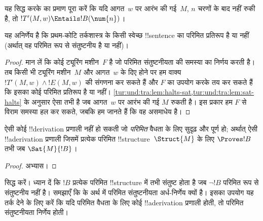 \documentclass[../../../include/open-logic-section]{subfiles}
\begin{document}
\begin{prob}
  यह सिद्ध करके  का प्रमाण पूरा
  करें कि यदि आगत~$w$ पर आरंभ की गई~$M$, $n$ चरणों के बाद नहीं रुकी है,
  तो $!T'(M,w) \Entails !B(\num{n})$।
\end{prob}

\begin{thm}[ट्राख्टेनब्रॉट का प्रमेय]
  यह अनिर्णेय है कि प्रथम-कोटि तर्कशास्त्र के किसी स्वेच्छ
  !!{sentence} का परिमित प्रतिरूप है या नहीं (अर्थात् वह परिमित रूप से
  संतुष्टनीय है या नहीं)।
\end{thm}

\begin{proof}
  मान लें कि कोई ट्यूरिंग मशीन~$F$ है जो परिमित संतुष्टनीयता की समस्या
  का निर्णय करती है। तब किसी भी ट्यूरिंग मशीन~$M$ और आगत~$w$ के दिए
  होने पर हम वाक्य~$!T'(M,w) \land !E(M,w)$ की संगणना कर सकते
  हैं और $F$ का उपयोग करके तय कर सकते हैं कि इसका कोई परिमित प्रतिरूप
  है या नहीं।
  \cref{tur:und:tra:lem:halts-sat,tur:und:tra:lem:sat-halts} के अनुसार
  ऐसा तभी है जब आगत~$w$ पर आरंभ की गई $M$ रुकती है। इस प्रकार हम $F$
  से विराम समस्या हल कर सकते, जबकि हम जानते हैं कि वह असमाधेय है।
\end{proof}

\begin{cor}%
  ऐसी कोई !!{derivation} प्रणाली नहीं हो सकती जो \emph{परिमित} वैधता
  के लिए सुदृढ़ और पूर्ण हो; अर्थात् ऐसी !!a{derivation} प्रणाली जिसमें
  प्रत्येक परिमित !!{structure}~$\Struct{M}$ के लिए
  $\Proves !B$ तभी जब $\Sat{M}{!B}$।
\end{cor}

\begin{proof}
  अभ्यास।
\end{proof}

\begin{prob}
   सिद्ध करें। ध्यान दें कि
  $!B$ प्रत्येक परिमित !!{structure} में तभी संतुष्ट होता है जब
  $\lnot !B$ परिमित रूप से संतुष्टनीय नहीं है। समझाएँ कि
   के अर्थ में परिमित संतुष्टनीयता
  अर्ध-निर्णेय क्यों है। इसका उपयोग यह तर्क देने के लिए करें कि यदि
  परिमित वैधता के लिए कोई !!a{derivation} प्रणाली होती, तो परिमित
  संतुष्टनीयता निर्णेय होती।
\end{prob}
\end{document}
